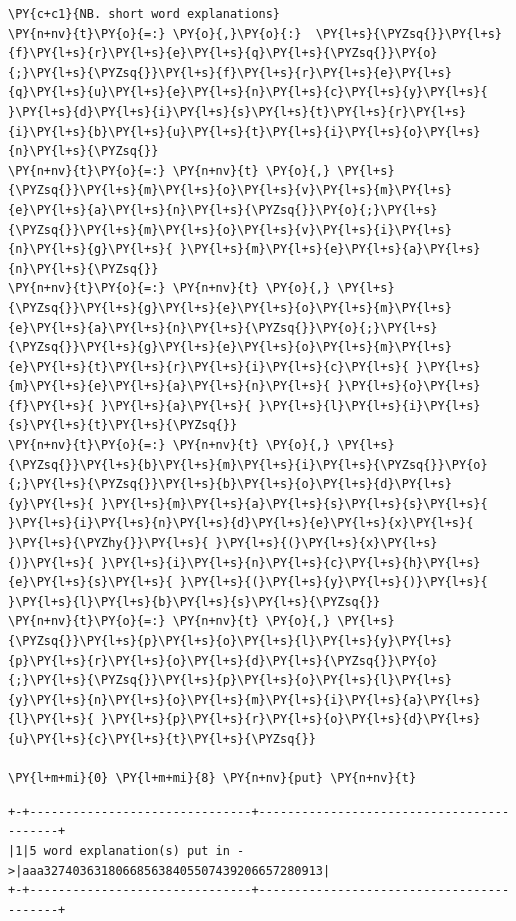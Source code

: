 \begin{tcolorbox}[breakable, size=fbox, boxrule=1pt, pad at break*=1mm,colback=cellbackground, colframe=cellborder]
\begin{Verbatim}[commandchars=\\\{\}]
\PY{c+c1}{NB. short word explanations}
\PY{n+nv}{t}\PY{o}{=:} \PY{o}{,}\PY{o}{:}  \PY{l+s}{\PYZsq{}}\PY{l+s}{f}\PY{l+s}{r}\PY{l+s}{e}\PY{l+s}{q}\PY{l+s}{\PYZsq{}}\PY{o}{;}\PY{l+s}{\PYZsq{}}\PY{l+s}{f}\PY{l+s}{r}\PY{l+s}{e}\PY{l+s}{q}\PY{l+s}{u}\PY{l+s}{e}\PY{l+s}{n}\PY{l+s}{c}\PY{l+s}{y}\PY{l+s}{ }\PY{l+s}{d}\PY{l+s}{i}\PY{l+s}{s}\PY{l+s}{t}\PY{l+s}{r}\PY{l+s}{i}\PY{l+s}{b}\PY{l+s}{u}\PY{l+s}{t}\PY{l+s}{i}\PY{l+s}{o}\PY{l+s}{n}\PY{l+s}{\PYZsq{}}
\PY{n+nv}{t}\PY{o}{=:} \PY{n+nv}{t} \PY{o}{,} \PY{l+s}{\PYZsq{}}\PY{l+s}{m}\PY{l+s}{o}\PY{l+s}{v}\PY{l+s}{m}\PY{l+s}{e}\PY{l+s}{a}\PY{l+s}{n}\PY{l+s}{\PYZsq{}}\PY{o}{;}\PY{l+s}{\PYZsq{}}\PY{l+s}{m}\PY{l+s}{o}\PY{l+s}{v}\PY{l+s}{i}\PY{l+s}{n}\PY{l+s}{g}\PY{l+s}{ }\PY{l+s}{m}\PY{l+s}{e}\PY{l+s}{a}\PY{l+s}{n}\PY{l+s}{\PYZsq{}}
\PY{n+nv}{t}\PY{o}{=:} \PY{n+nv}{t} \PY{o}{,} \PY{l+s}{\PYZsq{}}\PY{l+s}{g}\PY{l+s}{e}\PY{l+s}{o}\PY{l+s}{m}\PY{l+s}{e}\PY{l+s}{a}\PY{l+s}{n}\PY{l+s}{\PYZsq{}}\PY{o}{;}\PY{l+s}{\PYZsq{}}\PY{l+s}{g}\PY{l+s}{e}\PY{l+s}{o}\PY{l+s}{m}\PY{l+s}{e}\PY{l+s}{t}\PY{l+s}{r}\PY{l+s}{i}\PY{l+s}{c}\PY{l+s}{ }\PY{l+s}{m}\PY{l+s}{e}\PY{l+s}{a}\PY{l+s}{n}\PY{l+s}{ }\PY{l+s}{o}\PY{l+s}{f}\PY{l+s}{ }\PY{l+s}{a}\PY{l+s}{ }\PY{l+s}{l}\PY{l+s}{i}\PY{l+s}{s}\PY{l+s}{t}\PY{l+s}{\PYZsq{}}
\PY{n+nv}{t}\PY{o}{=:} \PY{n+nv}{t} \PY{o}{,} \PY{l+s}{\PYZsq{}}\PY{l+s}{b}\PY{l+s}{m}\PY{l+s}{i}\PY{l+s}{\PYZsq{}}\PY{o}{;}\PY{l+s}{\PYZsq{}}\PY{l+s}{b}\PY{l+s}{o}\PY{l+s}{d}\PY{l+s}{y}\PY{l+s}{ }\PY{l+s}{m}\PY{l+s}{a}\PY{l+s}{s}\PY{l+s}{s}\PY{l+s}{ }\PY{l+s}{i}\PY{l+s}{n}\PY{l+s}{d}\PY{l+s}{e}\PY{l+s}{x}\PY{l+s}{ }\PY{l+s}{\PYZhy{}}\PY{l+s}{ }\PY{l+s}{(}\PY{l+s}{x}\PY{l+s}{)}\PY{l+s}{ }\PY{l+s}{i}\PY{l+s}{n}\PY{l+s}{c}\PY{l+s}{h}\PY{l+s}{e}\PY{l+s}{s}\PY{l+s}{ }\PY{l+s}{(}\PY{l+s}{y}\PY{l+s}{)}\PY{l+s}{ }\PY{l+s}{l}\PY{l+s}{b}\PY{l+s}{s}\PY{l+s}{\PYZsq{}}
\PY{n+nv}{t}\PY{o}{=:} \PY{n+nv}{t} \PY{o}{,} \PY{l+s}{\PYZsq{}}\PY{l+s}{p}\PY{l+s}{o}\PY{l+s}{l}\PY{l+s}{y}\PY{l+s}{p}\PY{l+s}{r}\PY{l+s}{o}\PY{l+s}{d}\PY{l+s}{\PYZsq{}}\PY{o}{;}\PY{l+s}{\PYZsq{}}\PY{l+s}{p}\PY{l+s}{o}\PY{l+s}{l}\PY{l+s}{y}\PY{l+s}{n}\PY{l+s}{o}\PY{l+s}{m}\PY{l+s}{i}\PY{l+s}{a}\PY{l+s}{l}\PY{l+s}{ }\PY{l+s}{p}\PY{l+s}{r}\PY{l+s}{o}\PY{l+s}{d}\PY{l+s}{u}\PY{l+s}{c}\PY{l+s}{t}\PY{l+s}{\PYZsq{}}

\PY{l+m+mi}{0} \PY{l+m+mi}{8} \PY{n+nv}{put} \PY{n+nv}{t}
\end{Verbatim}
\end{tcolorbox}

    \begin{Verbatim}[commandchars=\\\{\}]
+-+-------------------------------+------------------------------------------+
|1|5 word explanation(s) put in ->|aaa327403631806685638405507439206657280913|
+-+-------------------------------+------------------------------------------+
    \end{Verbatim}

